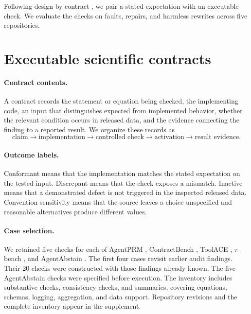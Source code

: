 \documentclass{article}
\begin{document}
Following design by contract \citep{meyer1992contract}, we pair a stated expectation with an executable check. We evaluate the checks on faults, repairs, and harmless rewrites across five repositories.

\section{Executable scientific contracts}

\paragraph{Contract contents.}
A contract records the statement or equation being checked, the implementing code, an input that distinguishes expected from implemented behavior, whether the relevant condition occurs in released data, and the evidence connecting the finding to a reported result. We organize these records as
\[
\text{claim} \rightarrow \text{implementation} \rightarrow
\text{controlled check} \rightarrow \text{activation} \rightarrow
\text{result evidence}.
\]

\paragraph{Outcome labels.}
Conformant means that the implementation matches the stated expectation on the tested input. Discrepant means that the check exposes a mismatch. Inactive means that a demonstrated defect is not triggered in the inspected released data. Convention sensitivity means that the source leaves a choice unspecified and reasonable alternatives produce different values.

\paragraph{Case selection.}
We retained five checks for each of AgentPRM \citep{choudhury2025agentprm}, ContractBench \citep{contractbench2026}, ToolACE \citep{liu2024toolace}, $\tau$-bench \citep{yao2025taubench}, and AgentAbstain \citep{liu2026agentabstain}. The first four cases revisit earlier audit findings. Their 20 checks were constructed with those findings already known. The five AgentAbstain checks were specified before execution. The inventory includes substantive checks, consistency checks, and summaries, covering equations, schemas, logging, aggregation, and data support. Repository revisions and the complete inventory appear in the supplement.
\end{document}
